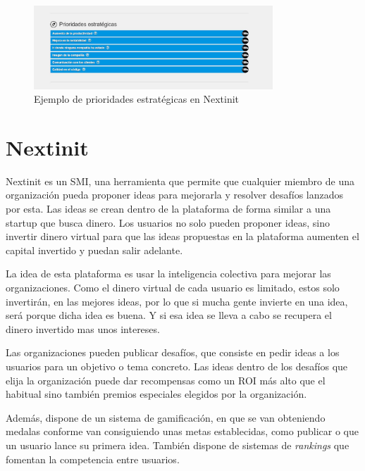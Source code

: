\begin{figure}[!h]
	\begin{center}
		\includegraphics[width=0.8\textwidth]{./img/introduccion/prioridades.png}
		\caption{Ejemplo de prioridades estratégicas en Nextinit}
		\label{fig:prioridades}
	\end{center}
\end{figure}
 
 
 \section{Nextinit}
 
 Nextinit es un \acs{SMI}, una herramienta que permite que cualquier miembro de una organización pueda
 proponer ideas para  mejorarla y resolver desafíos lanzados por esta. Las ideas se crean dentro de la 
 plataforma de forma similar a una startup que busca dinero. Los usuarios no solo pueden  proponer ideas, sino 
 invertir dinero virtual para que las ideas propuestas en la plataforma aumenten el capital invertido   y 
 puedan salir adelante.
 
 La idea de esta plataforma es usar la inteligencia colectiva para mejorar las organizaciones. Como el dinero 
 virtual de cada usuario es limitado, estos solo invertirán,  en las mejores ideas, por lo que si mucha gente 
 invierte en una idea, será porque dicha idea es buena. Y si esa idea se lleva a cabo se recupera el dinero 
 invertido  mas unos intereses.
 
 Las organizaciones pueden publicar desafíos, que consiste en pedir ideas a los usuarios para un 
 objetivo o tema concreto. Las ideas dentro de los desafíos que elija la organización puede dar 
 recompensas como un \acs{ROI} más alto que el habitual sino también premios especiales elegidos
 por la organización.
  
  Además, dispone de un sistema de gamificación, en que se van obteniendo medalas conforme van
  consiguiendo unas metas establecidas, como publicar o que un usuario lance su primera idea. También
   dispone de sistemas de \textit{rankings} que fomentan la competencia entre usuarios.
   
